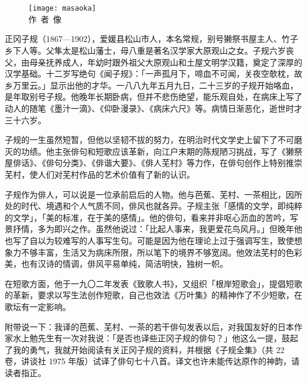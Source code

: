 
\chapter[{\FM 正岡子規}]{\FM {}}

\begin{center}
    \begin{figure}
        \centering
        \texttt{[image: masaoka]}\\[1em]
        \large{\FS 作~者~像}
    \end{figure}
\end{center}

\newpage
{\FS
    正冈子规（1867—1902），爱媛县松山市人，本名常规，别号獭祭书屋主人、竹子乡下人等。父隼太是松山藩士，母八重是著名汉学家大原观山之女。子规六岁丧父，由母亲抚养成人，年幼时跟外祖父大原观山和土屋文明学汉籍，奠定了深厚的汉学基础。十二岁写绝句《闻子规》：「一声孤月下，啼血不可闻，关夜空欹枕，故乡万里云。」显示出他的才华。一八八九年五月九日，二十三岁的子规开始咯血，是年取别号子规。他晚年长期卧病，但并不悲伤绝望，能乐观自处，在病床上写了动人的随笔《墨汁一滴》、《仰卧漫录》、《病床六尺》等。病情日渐恶化，逝世时才三十六岁。

    子规的一生虽然短暂，但他以坚韧不拔的努力，在明治时代文学史上留下了不可磨灭的功绩。他主张俳句和短歌应该革新，向江户末期的陈规陋习挑战，写了《獭祭屋俳话》、《俳句分类》、《俳谐大要》、《俳人芜村》等力作，在俳句创作上特别推崇芜村，使人们对芜村作品的艺术价值有了新的认识。

    子规作为俳人，可以说是一位承前启后的人物。他与芭蕉、芜村、一茶相比，因所处的时代、境遇和个人气质不同，俳风也就各异。子规主张「感情的文学，即纯粹的文学」，「美的标准，在于美的感情」。他的俳句，看来并非呕心沥血的苦吟，写景抒情，多为即兴之作。虽然他说过：「比起人事来，我更爱花鸟风月。」但晚年他也写了自以为较难写的人事写生句。可能是因为他在理论上过于强调写生，致使想象力不够丰富，生活又为病床所限，所以笔下的境界不够宽阔。他效法芜村的色彩美，也有汉诗的情调，俳风平易单纯，简洁明快，独树一帜。

    在短歌方面，他于一九〇二年发表《致歌人书》，又组织「根岸短歌会」，提倡短歌的革新，要求以写生法创作短歌，自己也效法《万叶集》的精神作了不少短歌，在歌坛有一定影响。

    附带说一下：我译的芭蕉、芜村、一茶的若干俳句发表以后，对我国友好的日本作家水上勉先生有一次对我说：「是否也译些正冈子规的俳句？」他这么一提，鼓起了我的勇气，我就开始阅读有关正冈子规的资料，并根据《子规全集》（共 22 卷，讲谈社 1975 年版）试译了俳句七十八首。译文也许未能传达原作的神韵，请读者指正。
}

